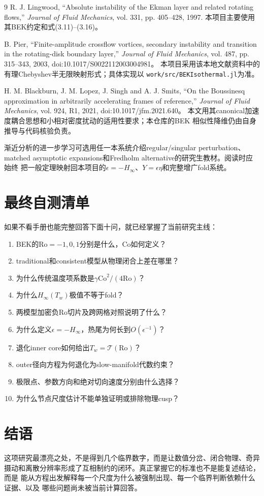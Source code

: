 \documentclass[UTF8,zihao=-4,openany]{ctexbook}
\newcommand{\eps}{\epsilon}
\newcommand{\Ro}{\mathrm{Ro}}
\newcommand{\Co}{\mathrm{Co}}
\newcommand{\Tcurve}{\mathcal T}
\begin{document}
\begin{thebibliography}{9}
R. J. Lingwood,
``Absolute instability of the Ekman layer and related rotating flows,''
\emph{Journal of Fluid Mechanics}, vol. 331, pp. 405--428, 1997.
本项目主要使用其BEK约定和式(3.11)--(3.16)。

B. Pier,
``Finite-amplitude crossflow vortices, secondary instability and transition
in the rotating-disk boundary layer,''
\emph{Journal of Fluid Mechanics}, vol. 487, pp. 315--343, 2003,
doi:10.1017/S0022112003004981。
本项目采用该本地文献资料中的有理Chebyshev半无限映射形式；具体实现以
\texttt{work/src/BEKIsothermal.jl}为准。

H. M. Blackburn, J. M. Lopez, J. Singh and A. J. Smits,
``On the Boussinesq approximation in arbitrarily accelerating frames of reference,''
\emph{Journal of Fluid Mechanics}, vol. 924, R1, 2021,
doi:10.1017/jfm.2021.640。
本文用其canonical加速度耦合思想和小相对密度扰动的适用性要求；本仓库的BEK
相似性降维仍由自身推导与代码核验负责。

渐近分析的进一步学习可选用任一本系统介绍regular/singular perturbation、
matched asymptotic expansions和Fredholm alternative的研究生教材。阅读时应始终
把一般定理映射回本项目的$\eps=-H_\infty$、$Y=\eps\eta$和完整增广fold系统。
\end{thebibliography}

\chapter{最终自测清单}

如果不看手册也能完整回答下面十问，就已经掌握了当前研究主线：
\begin{enumerate}
 \item BEK的$\Ro=-1,0,1$分别是什么，$\Co$如何定义？
 \item traditional和consistent模型从物理闭合上差在哪里？
 \item 为什么传统温度项系数是$\gamma\Co^2/(4\Ro)$？
 \item 为什么$H_\infty(T_w)$极值不等于fold？
  \item 两模型加密负$\Ro$切片及跨网格对照说明了什么？
 \item 为什么定义$\eps=-H_\infty$，热尾为何长到$O(\eps^{-1})$？
 \item 退化inner core如何给出$T_w=\Tcurve(\Ro)$？
 \item outer径向方程为何退化为slow-manifold代数约束？
 \item 极限点、参数方向和绝对切向速度分别由什么选择？
 \item 为什么节点尺度估计不能单独证明或排除物理cusp？
\end{enumerate}

\backmatter
\chapter*{结语}

这项研究最漂亮之处，不是得到几个临界数字，而是让数值分岔、闭合物理、奇异
摄动和离散分辨率形成了互相制约的闭环。真正掌握它的标准也不是能复述结论，而是
能从方程出发解释每一个尺度为什么被强制出现、每一个临界判断依赖什么证据、以及
哪些问题尚未被当前计算回答。
\end{document}
